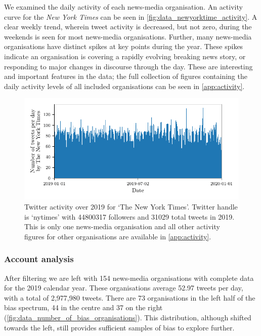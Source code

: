 We examined the daily activity of each news-media organisation. An activity curve for the \emph{New York Times} can be seen in \autoref{fig:data_newyorktime_activity}. 
A clear weekly trend, wherein tweet activity is decreased, but not zero, during the weekends is seen for most news-media organisations. Further, many news-media organisations have distinct spikes at key points during the year. These spikes indicate an organisation is covering a rapidly evolving breaking news story, or responding to major changes in discourse through the day. These are interesting and important features in the data; the full collection of figures containing the daily activity levels of all included organisations can be seen in \autoref{app:activity}.

\begin{figure}[!htbp]
\centering
	\includegraphics{chapter1/figs/tweet_times_nytimes.pdf}
	\caption{Twitter activity over 2019 for `The New York Times'.
		Twitter handle is `nytimes' with 44800317 followers and 31029 total tweets in 2019. This is only one news-media organisation and all other activity figures for other organisations are available in \autoref{app:activity}.}
	\label{fig:data_newyorktime_activity}
\end{figure}


\subsubsection{Account analysis}
After filtering we are left with 154 news-media organisations with complete data for the 2019 calendar year. %
These organisations average 52.97 tweets per day, with a total of 2,977,980 tweets.
There are 73 organisations in the left half of the bias spectrum, 44 in the centre and 37 on the right (\autoref{fig:data_number_of_bias_organisations}). This distribution, although shifted towards the left, still provides sufficient samples of bias to explore further.


